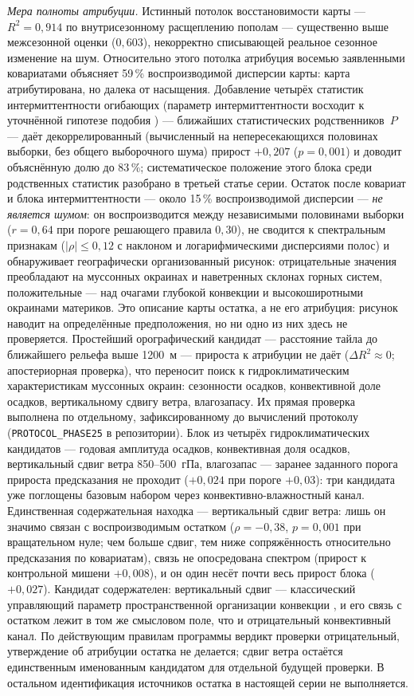 \documentclass[11pt,a4paper]{article}
\begin{document}
\emph{Мера полноты атрибуции.} Истинный потолок восстановимости карты --- $R^2=0{,}914$ по внутрисезонному расщеплению пополам --- существенно выше межсезонной оценки ($0{,}603$), некорректно списывающей реальное сезонное изменение на шум. Относительно этого потолка атрибуция восемью заявленными ковариатами объясняет 59\,\% воспроизводимой дисперсии карты: карта атрибутирована, но далека от насыщения. Добавление четырёх статистик интермиттентности огибающих (параметр интермиттентности восходит к уточнённой гипотезе подобия \cite{Kolmogorov1962}) --- ближайших статистических родственников~$P$ --- даёт декоррелированный (вычисленный на непересекающихся половинах выборки, без общего выборочного шума) прирост $+0{,}207$ ($p=0{,}001$) и доводит объяснённую долю до 83\,\%; систематическое положение этого блока среди родственных статистик разобрано в третьей статье серии. Остаток после ковариат и блока интермиттентности --- около 15\,\% воспроизводимой дисперсии --- \emph{не является шумом}: он воспроизводится между независимыми половинами выборки ($r=0{,}64$ при пороге решающего правила $0{,}30$), не сводится к спектральным признакам ($\lvert\rho\rvert\le0{,}12$ с наклоном и логарифмическими дисперсиями полос) и обнаруживает географически организованный рисунок: отрицательные значения преобладают на муссонных окраинах \cite{RodwellHoskins1996} и наветренных склонах горных систем, положительные --- над очагами глубокой конвекции и высокоширотными окраинами материков. Это описание карты остатка, а не его атрибуция: рисунок наводит на определённые предположения, но ни одно из них здесь не проверяется. Простейший орографический кандидат --- расстояние тайла до ближайшего рельефа выше 1200~м --- прироста к атрибуции не даёт ($\Delta R^2\approx0$; апостериорная проверка), что переносит поиск к гидроклиматическим характеристикам муссонных окраин: сезонности осадков, конвективной доле осадков, вертикальному сдвигу ветра, влагозапасу. Их прямая проверка выполнена по отдельному, зафиксированному до вычислений протоколу (\texttt{PROTOCOL\_PHASE25} в репозитории). Блок из четырёх гидроклиматических кандидатов --- годовая амплитуда осадков, конвективная доля осадков, вертикальный сдвиг ветра 850--500~гПа, влагозапас --- заранее заданного порога прироста предсказания не проходит ($+0{,}024$ при пороге $+0{,}03$): три кандидата уже поглощены базовым набором через конвективно-влажностный канал. Единственная содержательная находка --- вертикальный сдвиг ветра: лишь он значимо связан с воспроизводимым остатком ($\rho=-0{,}38$, $p=0{,}001$ при вращательном нуле; чем больше сдвиг, тем ниже сопряжённость относительно предсказания по ковариатам), связь не опосредована спектром (прирост к контрольной мишени $+0{,}008$), и он один несёт почти весь прирост блока ($+0{,}027$). Кандидат содержателен: вертикальный сдвиг --- классический управляющий параметр пространственной организации конвекции \cite{RotunnoKlempWeisman1988,Wing2017}, и его связь с остатком лежит в том же смысловом поле, что и отрицательный конвективный канал. По действующим правилам программы вердикт проверки отрицательный, утверждение об атрибуции остатка не делается; сдвиг ветра остаётся единственным именованным кандидатом для отдельной будущей проверки. В остальном идентификация источников остатка в настоящей серии не выполняется.
\end{document}
